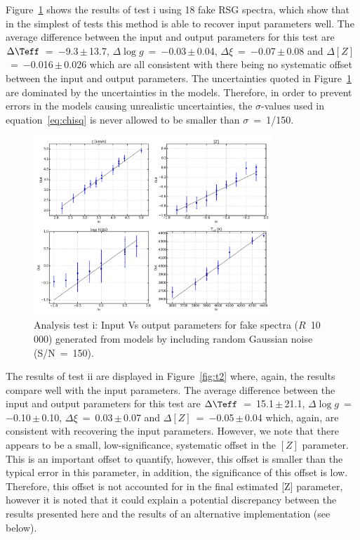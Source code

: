 Figure~\ref{fig:t1} shows the results of test i using 18 fake RSG spectra, which show that in the simplest of tests this method is able to recover input parameters well.
The average difference between the input and output parameters for this test are
$\Delta\Teff$~=~$-$9.3\,$\pm$\,13.7,
$\Delta\log g$~=~$-$0.03\,$\pm$\,0.04,
$\Delta\xi$~=~$-$0.07\,$\pm$\,0.08 and
$\Delta[Z]$~=~$-$0.016\,$\pm$\,0.026
which are all consistent with there being no systematic offset between the input and output parameters.
The uncertainties quoted in Figure~\ref{fig:t1} are dominated by the uncertainties in the models.
Therefore, in order to prevent errors in the models causing unrealistic uncertainties,
the $\sigma$-values used in equation~\ref{eq:chisq} is never allowed to be smaller than $\sigma$~=~1/150.

\begin{figure}
 \centering
 \includegraphics[width=0.80\textwidth]{JAnal/Fakespec-t1-v2}
 \caption[Analysis test i: Input against output parameters using fake RSG spectra at S/N~=~150 ($R$~=~10\,000)]{
 Analysis test i: Input Vs output parameters for fake spectra ($R$~10\,000) generated from models by including random Gaussian noise (S/N~=~150).
\label{fig:t1}
         }
\end{figure}


The results of test ii are displayed in Figure~\ref{fig:t2} where, again, the results compare well with the input parameters.
The average difference between the input and output parameters for this test are
$\Delta\Teff$~=~15.1\,$\pm$\,21.1,  %
$\Delta\log g$~=~$-$0.10\,$\pm$\,0.10, %
$\Delta\xi$~=~0.03\,$\pm$\,0.07 and %
$\Delta[Z]$~=~$-$0.05\,$\pm$\,0.04     %
which, again, are consistent with recovering the input parameters.
However, we note that there appears to be a small, low-significance, systematic offset in the $[Z]$ parameter.
This is an important offset to quantify, however, this offset is smaller than the typical error in this parameter, in addition, the significance of this offset is low.
Therefore, this offset is not accounted for in the final estimated [Z] parameter, however it is noted that it could explain a potential discrepancy between the results presented here and the results of an alternative implementation (see below).

